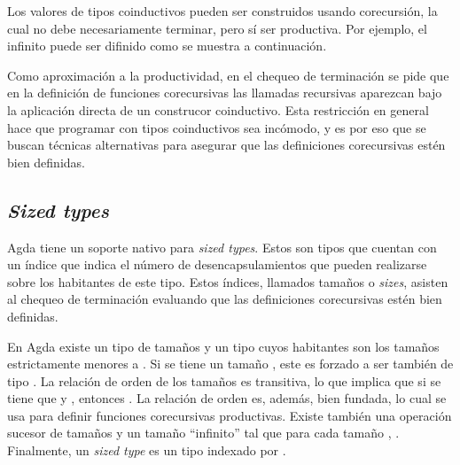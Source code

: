 Los valores de tipos coinductivos pueden ser construidos usando corecursión, la cual no debe necesariamente terminar, pero sí ser productiva. Por ejemplo, el infinito puede ser difinido como se muestra a continuación.


Como aproximación a la productividad, en el chequeo de terminación se pide que en la definición de funciones corecursivas las llamadas recursivas aparezcan bajo la aplicación directa de un construcor coinductivo. Esta restricción en general hace que programar con tipos coinductivos sea incómodo, y es por eso que se buscan técnicas alternativas para asegurar que las definiciones corecursivas estén bien definidas. 

\subsection{\textit{Sized types}}\label{coind:agda:sized}

Agda tiene un soporte nativo para \textit{sized types}. Estos son tipos que cuentan con un índice que indica el número de desencapsulamientos que pueden realizarse sobre los habitantes de este tipo. Estos índices, llamados tamaños o \textit{sizes}, asisten al chequeo de terminación evaluando que las definiciones corecursivas estén bien definidas. 

En Agda existe un tipo  de tamaños y un tipo   cuyos habitantes son los tamaños estrictamente menores a . Si se tiene un tamaño  \AgdaSymbol{:}  , este es forzado a ser también de tipo . La relación de orden de los tamaños es transitiva, lo que implica que si se tiene que  \AgdaSymbol{:}   y  \AgdaSymbol{:}  , entonces  \AgdaSymbol{:}  . La relación de orden es, además, bien fundada, lo cual se usa para definir funciones corecursivas productivas. Existe también una operación sucesor de tamaños \AgdaFunction{$\uparrow$} y un tamaño ``infinito'' \AgdaArgument{$\infty$} tal que para cada tamaño ,  \AgdaSymbol{:}  \AgdaArgument{$\infty$}. Finalmente, un \textit{sized type} es un tipo indexado por .

